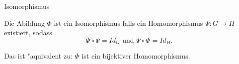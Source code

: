 \documentclass[class=article, crop=false]{standalone}
\begin{document}
\begin{zettel}{Isomorphismus}
\begin{flashcard}[]{}
	\begin{definition}[Isomorphismus]
		Die Abildung $\Phi$ ist ein Isomorphismus falls ein Homomorphismus $\Psi: G \longrightarrow H$ existiert, sodass
		\[
			\Phi \circ \Psi = Id_G \text{ und } \Psi \circ \Phi =  Id_H
		.\]

		Das ist "aquivalent zu: $\Phi$ ist ein bijektiver Homomorphismus.
	\end{definition}
\end{flashcard}
\end{zettel}
\end{document}
